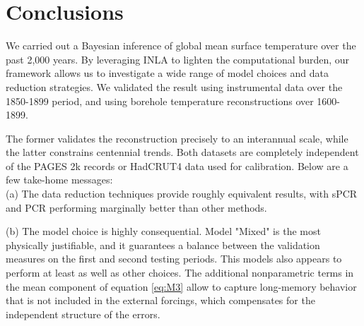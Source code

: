 \documentclass[12pt]{amsart}
\theoremstyle{plain}
\theoremstyle{definition}
\theoremstyle{remark}
\begin{document}



\section{Conclusions}
We carried out a Bayesian inference of global mean surface temperature over
the past 2,000 years. By leveraging INLA to lighten the computational burden, our framework allows us to investigate a wide range of model choices and data reduction strategies. We validated the result using instrumental data over the 1850-1899 period, and using borehole temperature reconstructions over 1600-1899. 

The former validates the reconstruction precisely to an interannual scale, while
the latter constrains centennial trends. Both datasets are completely
independent of the PAGES 2k records or HadCRUT4 data used for calibration. Below are a few take-home messages:\\
     (a) The data reduction techniques provide roughly equivalent results, with
      sPCR and PCR performing marginally better than other methods.
    
     \noindent (b) The model choice is highly consequential. Model "Mixed" is the most
      physically justifiable, and it guarantees a balance between the
      validation measures on the first and second testing periods. This models also
      appears to perform at least as well as other choices. The 
      additional nonparametric terms in the mean component of equation \eqref{eq:M3} allow
      to capture long-memory behavior that is not included in the external forcings, which compensates for the independent structure of the errors. 
      
\end{document}
